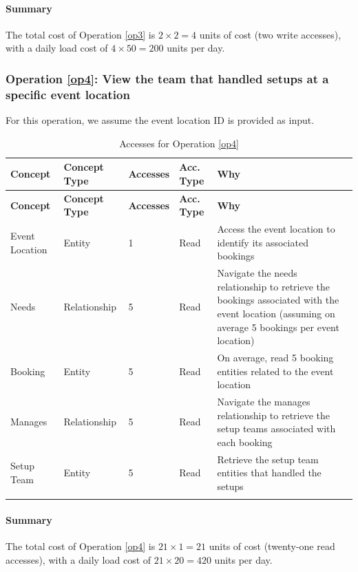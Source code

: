 \paragraph{Summary}
The total cost of Operation \ref{op3} is $2 \times 2 = 4$ units of cost (two write accesses), with a daily load cost of $4 \times 50 = 200$ units per day.

\subsubsection{Operation \ref{op4}: View the team that handled setups at a specific event location}

For this operation, we assume the event location ID is provided as input.

\begin{longtable}[H]{|p{2cm}|p{2cm}|p{2cm}|p{2cm}|p{7cm}|}
    \hline
    \textbf{Concept} & \textbf{Concept Type} & \textbf{Accesses} & \textbf{Acc. Type} & \textbf{Why} \\
    \hline
    \endfirsthead
    \hline
    \textbf{Concept} & \textbf{Concept Type} & \textbf{Accesses} & \textbf{Acc. Type} & \textbf{Why} \\
    \hline
    \endhead
    Event Location & Entity & 1 & Read & Access the event location to identify its associated bookings \\
    \hline
    Needs & Relationship & 5 & Read & Navigate the needs relationship to retrieve the bookings associated with the event location (assuming on average 5 bookings per event location) \\
    \hline
    Booking & Entity & 5 & Read & On average, read 5 booking entities related to the event location \\
    \hline
    Manages & Relationship & 5 & Read & Navigate the manages relationship to retrieve the setup teams associated with each booking \\
    \hline
    Setup Team & Entity & 5 & Read & Retrieve the setup team entities that handled the setups \\
    \hline
    \caption{Accesses for Operation \ref{op4}}
    \label{tab:op4-accesses-logical}
\end{longtable}

\paragraph{Summary}
The total cost of Operation \ref{op4} is $21 \times 1 = 21$ units of cost (twenty-one read accesses), with a daily load cost of $21 \times 20 = 420$ units per day.

